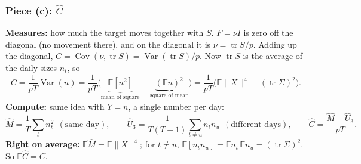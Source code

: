 \documentclass[12pt]{article}
\begin{document}
\subsubsection*{Piece (c): $\hat C$}
\textbf{Measures:} how much the target moves together with $S$. $F=\nu I$ is zero off the diagonal (no
movement there), and on the diagonal it is $\nu=\operatorname{tr}S/p$. Adding up the diagonal,
$C=\operatorname{Cov}(\nu,\operatorname{tr}S)=\operatorname{Var}(\operatorname{tr}S)/p$. Now $\operatorname{tr}S$ is the average of the daily sizes $n_t$, so
\[
C=\frac{1}{pT}\operatorname{Var}(n)=\frac{1}{pT}\Big(\underbrace{\mathbb{E}[n^2]}_{\text{mean of square}}-\underbrace{(\mathbb{E}n)^2}_{\text{square of mean}}\Big)
=\frac{1}{pT}\Big(\mathbb{E}\|X\|^4-(\operatorname{tr}\Sigma)^2\Big).
\]
\textbf{Compute:} same idea with $Y=n$, a single number per day:
\[
\hat M=\frac1T\sum_tn_t^2\ \ (\text{same day}),\qquad
\hat U_3=\frac{1}{T(T-1)}\sum_{t\neq u}n_tn_u\ \ (\text{different days}),\qquad
\hat C=\frac{\hat M-\hat U_3}{pT}.
\]
\textbf{Right on average:} $\mathbb{E}\hat M=\mathbb{E}\|X\|^4$; for $t\neq u$, $\mathbb{E}[n_tn_u]=\mathbb{E}n_t\,\mathbb{E}n_u=(\operatorname{tr}\Sigma)^2$. So $\mathbb{E}\hat C=C$.
\end{document}

